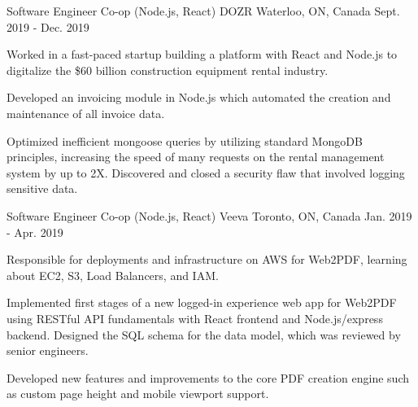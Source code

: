 \begin{cventries}
  \cventry
    {Software Engineer Co-op (Node.js, React)} %
    {DOZR} %
    {Waterloo, ON, Canada} %
    {Sept. 2019 - Dec. 2019} %
    {
      \begin{cvitems} %
\item Worked in a fast-paced startup building a platform with React and Node.js to digitalize the \$60 billion construction equipment rental industry.
\item Developed an invoicing module in Node.js which automated the creation and maintenance of all invoice data.
\item Optimized inefficient mongoose queries by utilizing standard MongoDB principles, increasing the speed of many requests on the rental management system by up to 2X. Discovered and closed a security flaw that involved logging sensitive data.
      \end{cvitems}
    }

  \cventry
    {Software Engineer Co-op (Node.js, React)} %
    {Veeva} %
    {Toronto, ON, Canada} %
    {Jan. 2019 - Apr. 2019} %
    {
      \begin{cvitems} %
\item Responsible for deployments and infrastructure on AWS for Web2PDF, learning about EC2, S3, Load Balancers, and IAM.
\item Implemented first stages of a new logged-in experience web app for Web2PDF using RESTful API fundamentals with React frontend and Node.js/express backend. Designed the SQL schema for the data model, which was reviewed by senior engineers.
\item Developed new features and improvements to the core PDF creation engine such as custom page height and mobile viewport support.
      \end{cvitems}
    }


\end{cventries}
